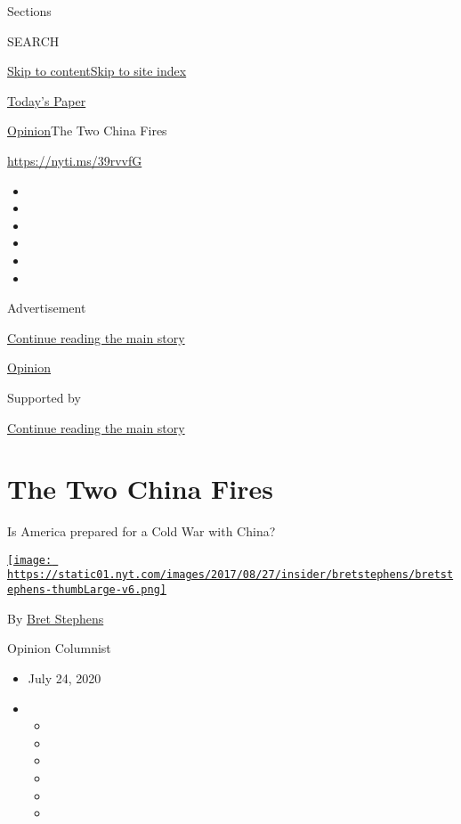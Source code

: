 Sections

SEARCH

\protect\hyperlink{site-content}{Skip to
content}\protect\hyperlink{site-index}{Skip to site index}

\href{https://myaccount.nytimes.com/auth/login?response_type=cookie\&client_id=vi}{}

\href{https://www.nytimes.com/section/todayspaper}{Today's Paper}

\href{/section/opinion}{Opinion}\textbar{}The Two China Fires

\href{https://nyti.ms/39rvvfG}{https://nyti.ms/39rvvfG}

\begin{itemize}
\item
\item
\item
\item
\item
\item
\end{itemize}

Advertisement

\protect\hyperlink{after-top}{Continue reading the main story}

\href{/section/opinion}{Opinion}

Supported by

\protect\hyperlink{after-sponsor}{Continue reading the main story}

\hypertarget{the-two-china-fires}{%
\section{The Two China Fires}\label{the-two-china-fires}}

Is America prepared for a Cold War with China?

\href{https://www.nytimes.com/by/bret-stephens}{\texttt{[image: https://static01.nyt.com/images/2017/08/27/insider/bretstephens/bretstephens-thumbLarge-v6.png]}}

By \href{https://www.nytimes.com/by/bret-stephens}{Bret Stephens}

Opinion Columnist

\begin{itemize}
\item
  July 24, 2020
\item
  \begin{itemize}
  \item
  \item
  \item
  \item
  \item
  \item
  \end{itemize}
\end{itemize}

